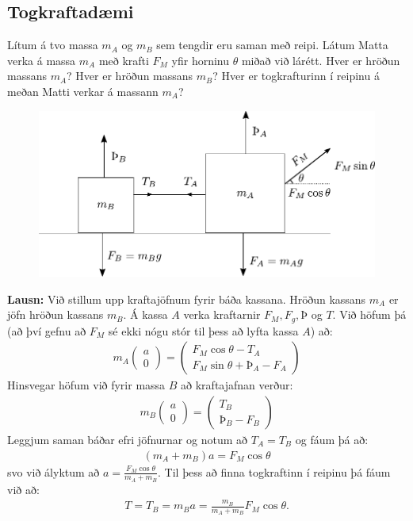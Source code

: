 \subsection*{Togkraftadæmi}

Lítum á tvo massa $m_A$ og $m_B$ sem tengdir eru saman með reipi. Látum Matta verka á massa $m_A$ með krafti $F_M$ yfir horninu $\theta$ miðað við lárétt. Hver er hröðun massans $m_A$? Hver er hröðun massans $m_B$? Hver er togkrafturinn í reipinu á meðan Matti verkar á massann $m_A$?

\begin{figure}[H]
    \centering
    \includegraphics[scale = 0.7]{figures/ytakubb.pdf}
\end{figure}

\textbf{Lausn:} Við stillum upp kraftajöfnum fyrir báða kassana. Hröðun kassans $m_A$ er jöfn hröðun kassans $m_B$. Á kassa $A$ verka kraftarnir $F_M, F_g, Þ$ og $T$. Við höfum þá (að því gefnu að $F_M$ sé ekki nógu stór til þess að lyfta kassa $A$) að:
\begin{align*}
    m_A\begin{pmatrix}
    a \\
    0
    \end{pmatrix} = \begin{pmatrix}
    F_M \cos\theta - T_A \\
    F_M\sin\theta + Þ_A - F_A
    \end{pmatrix}
\end{align*}
Hinsvegar höfum við fyrir massa $B$ að kraftajafnan verður:
\begin{align*}
   m_B \begin{pmatrix}
a \\ 0
\end{pmatrix} = \begin{pmatrix}
T_B \\ Þ_B - F_B
\end{pmatrix} 
\end{align*}
Leggjum saman báðar efri jöfnurnar og notum að $T_A = T_B$ og fáum þá að:
\begin{align*}
    \left(m_A + m_B \right)a = F_M \cos\theta
\end{align*}
svo við ályktum að $a = \frac{F_M \cos\theta}{m_A + m_B}$. Til þess að finna togkraftinn í reipinu þá fáum við að:
\begin{align*}
    T = T_B = m_Ba = \frac{m_B}{m_A + m_B}F_M \cos\theta.
\end{align*}

